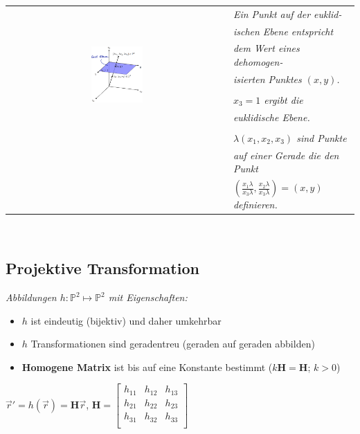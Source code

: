 \begin{tabular}{cl}
    \multirow{9}{*}{
        \includegraphics[width=0.24\textwidth]{assets/euclidean-plane.png}
    }
    & \textit{Ein Punkt auf der euklid-} \\
    & \textit{ischen Ebene entspricht} \\
    & \textit{dem Wert eines dehomogen-} \\
    & \textit{isierten Punktes $(x,y)$.} \\
    & \\
    & \textit{$x_3 = 1$ ergibt die} \\
    & \textit{euklidische Ebene.} \\
    & \\
    & \textit{$\lambda(x_1, x_2, x_3)$ sind Punkte} \\
    & \textit{auf einer Gerade die den Punkt} \\
    & \textit{$(\frac{x_1 \lambda}{x_3 \lambda}, \frac{x_2 \lambda}{x_3 \lambda}) = (x,y)$ definieren.} \\
\end{tabular} \\

\subsection{Projektive Transformation}

\textit{
    Abbildungen $h: \mathbb{P}^2 \mapsto \mathbb{P}^2$
    mit Eigenschaften:
}

\begin{itemize}
    \item $h$ ist eindeutig (bijektiv) und daher umkehrbar
    \item $h$ Transformationen sind geradentreu (geraden auf geraden abbilden)
    \item \textbf{Homogene Matrix} ist bis auf eine Konstante bestimmt ($k\mathbf{H} = \mathbf{H}$; $k > 0$)
\end{itemize}

$\vec{r}' = h(\vec{r}) = \mathbf{H} \vec{r}$, $\mathbf{H} = \begin{bmatrix}
    h_{11} & h_{12} & h_{13} \\
    h_{21} & h_{22} & h_{23} \\
    h_{31} & h_{32} & h_{33} \\
\end{bmatrix}$

